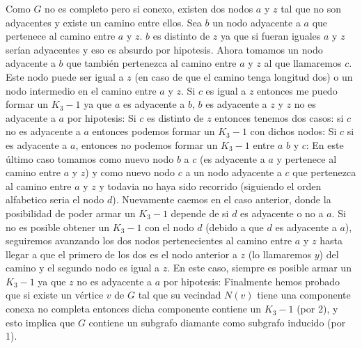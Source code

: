 \documentclass[a4paper,11pt] {article}
\begin{document}
\begin{itemize}
Como $G$ no es completo pero si conexo, existen dos nodos $a$ y $z$ tal que no son adyacentes y existe un camino entre ellos. Sea $b$ un nodo adyacente a $a$ que pertenece al camino entre $a$ y $z$. $b$ es distinto de $z$ ya que si fueran iguales $a$ y $z$ ser\'ian adyacentes y eso es absurdo por hipotesis. Ahora tomamos un nodo adyacente a $b$ que tambi\'en pertenezca al camino entre $a$ y $z$ al que llamaremos $c$. Este nodo puede ser igual a $z$ (en caso de que el camino tenga longitud dos) o un nodo intermedio en el camino entre $a$ y $z$. Si $c$ es igual a $z$ entonces me puedo formar un $K_{3}-1$ ya que $a$ es adyacente a $b$, $b$ es adyacente a $z$ y $z$ no es adyacente a $a$ por hipotesis:
Si $c$ es distinto de $z$ entonces tenemos dos casos: si $c$ no es adyacente a $a$ entonces podemos formar un $K_{3}-1$ con dichos nodos:
Si $c$ si es adyacente a $a$, entonces no podemos formar un $K_{3}-1$ entre $a$ $b$ y $c$:
En este \'ultimo caso tomamos como nuevo nodo $b$ a $c$ (es adyacente a $a$ y pertenece al camino entre $a$ y $z$) y como nuevo nodo $c$ a un nodo adyacente a $c$ que pertenezca al camino entre $a$ y $z$ y todavia no haya sido recorrido (siguiendo el orden alfabetico seria el nodo $d$). Nuevamente caemos en el caso anterior, donde la posibilidad de poder armar un $K_{3}-1$ depende de si $d$ es adyacente o no a $a$. Si no es posible obtener un $K_{3}-1$ con el nodo $d$ (debido a que $d$ es adyacente a $a$), seguiremos avanzando los dos nodos pertenecientes al camino entre $a$ y $z$ hasta llegar a que el primero de los dos es el nodo anterior a $z$ (lo llamaremos $y$) del camino y el segundo nodo es igual a $z$. En este caso, siempre es posible armar un $K_{3}-1$ ya que $z$ no es adyacente a $a$ por hipotesis:
Finalmente hemos probado que si existe un v\'ertice $v$ de $G$ tal que su vecindad $N(v)$ tiene una componente conexa no completa entonces dicha componente contiene un $K_{3}-1$ (por 2), y esto implica que $G$ contiene un subgrafo diamante como subgrafo inducido (por 1).


\end{itemize}
\end{document}
